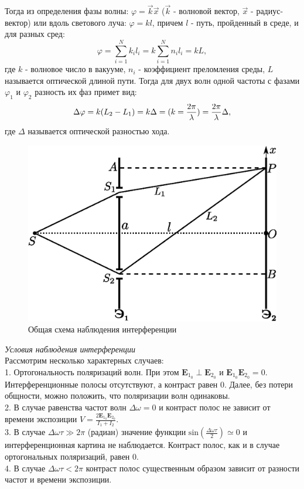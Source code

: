 ﻿\documentclass[__main__.tex]{subfiles}
\begin{document}
Тогда из определения фазы волны: $\varphi = \vec{k}\vec{x}$ ($\vec{k}$ - волновой вектор, $\vec{x}$ - радиус-вектор) или вдоль светового луча: $\varphi = kl$, причем $l$ - путь, пройденный в среде, и для разных сред:
$$
\varphi = \sum_{i=1}^{N}k_i l_i = k\sum_{i=1}^{N}n_i l_i = kL,
$$
где $k$ - волновое число в вакууме, $n_i$ - коэффициент преломления среды, $L$ называется оптической длиной пути.
Тогда для двух волн одной частоты с фазами $\varphi_1$ и $\varphi_2$ разность их фаз примет вид:
\begin{gather}
\llabel{o-02-phasediff}
\Delta \varphi = k(L_2 - L_1) = k \Delta =
(k = \frac{2\pi}{\lambda}) =
\frac{2\pi}{\lambda}\Delta,
\end{gather}
где $\Delta$ называется оптической разностью хода. 

\begin{figure}
	\includegraphics[width=1\linewidth]{img/o-05_1}{}
	\caption{Общая схема наблюдения интерференции}
\end{figure}

\textit{Условия наблюдения интерференции}\\
Рассмотрим несколько характерных случаев:\\
1. Ортогональность поляризаций волн.
При этом ${{\mathbf  E}}_{{1_{{0}}}}\perp {{\mathbf  E}}_{{2_{{0}}}}$  и   ${{\mathbf  E}}_{{1_{{0}}}}{{\mathbf  E}}_{{2_{{0}}}}=0$. Интерференционные полосы отсутствуют, а контраст равен 0. Далее, без потери общности, можно положить, что поляризации волн одинаковы.\\
2. В случае равенства частот волн ${\mathbf  {}}\Delta \omega = 0$ и контраст полос не зависит от времени экспозиции $V={\frac  {2{{\mathbf  E}}_{{1_{{0}}}}{{\mathbf  E}}_{{2_{{0}}}}}{I_{1}+I_{2}}}.$\\
3. В случае ${\mathbf  {}}\Delta \omega \tau \gg 2\pi$   (радиан) значение функции   ${\displaystyle \mathrm {sin} ({\frac {\Delta \omega \tau }{2}})\simeq 0}$  и интерференционная картина не наблюдается. Контраст полос, как и в случае ортогональных поляризаций, равен 0.\\
4. В случае ${\mathbf  {}}\Delta \omega \tau <2\pi$   контраст полос существенным образом зависит от разности частот и времени экспозиции.\\
\end{document}
